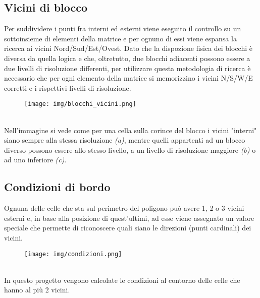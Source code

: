 	\subsection{Vicini di blocco}
		Per suddividere i punti fra interni ed esterni viene eseguito il controllo su un sottoinsieme di elementi della matrice e per ognuno di essi viene espansa la ricerca ai vicini Nord/Sud/Est/Ovest. Dato che la dispozione fisica dei blocchi \`{e} diversa da quella logica e che, oltretutto, due blocchi adiacenti possono essere a due livelli di risoluzione differenti, per utilizzare questa metodologia di ricerca \`{e} necessario che per ogni elemento della matrice si memorizzino i vicini N/S/W/E corretti e i rispettivi livelli di risoluzione. 
		\begin{figure}[htbp]
			\centering
			\texttt{[image: img/blocchi\_vicini.png]}
		\end{figure}\\
		Nell'immagine si vede come per una cella sulla corince del blocco i vicini "interni" siano sempre alla stessa risoluzione \textit{(a)}, mentre quelli appartenti ad un blocco diverso possono essere allo stesso livello, a un livello di risoluzione maggiore \textit{(b)} o ad uno inferiore \textit{(c)}.

	\subsection{Condizioni di bordo}
		Ognuna delle celle che sta sul perimetro del poligono pu\`{o} avere 1, 2 o 3 vicini esterni e, in base alla posizione di quest'ultimi, ad esse viene assegnato un valore speciale che permette di riconoscere quali siano le direzioni (punti cardinali) dei vicini.  
		\begin{figure}[htbp]
			\centering
			\texttt{[image: img/condizioni.png]}
		\end{figure}\\	
		In questo progetto vengono calcolate le condizioni al contorno delle celle che hanno al pi\`{u} 2  vicini.
